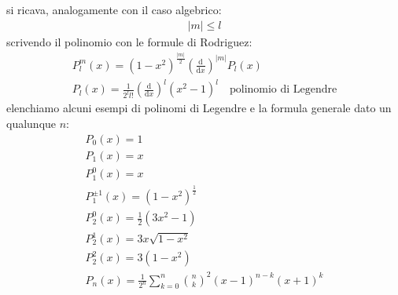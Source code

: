 si ricava, analogamente con il caso algebrico:
\begin{equation}\begin{split}
|m|\le l
\end{split}\end{equation}
scrivendo il polinomio con le formule di Rodriguez:
\begin{equation}\begin{split}
P_l^m\left(x\right)=\left(1-x^2\right)^{\frac{|m|}{2}}\left(\frac{\textrm{d}}{\textrm{d}x}\right)^{|m|}P_l\left(x\right)\\
P_l\left(x\right)=\frac{1}{2^ll!}\left(\frac{\textrm{d}}{\textrm{d}x}\right)^l\left(x^2-1\right)^l \quad \textrm{polinomio di Legendre}
\end{split}\end{equation}
elenchiamo alcuni esempi di polinomi di Legendre e la formula generale dato un qualunque $n$:
\begin{equation}\begin{split}
P_0\left(x\right)=1 \\
P_1\left(x\right)=x \\
P_1^0\left(x\right)=x \\
P_1^{\pm 1}\left(x\right)=\left(1-x^2\right)^{\frac{1}{2}} \\
P_2^0\left(x\right)=\frac{1}{2}\left(3x^2-1\right) \\
P_2^1\left(x\right)=3x\sqrt{1-x^2} \\
P_2^2\left(x\right)=3\left(1-x^2\right) \\
P_n\left(x\right)=\frac{1}{2^n}\sum_{k=0}^{n}{{{n}\choose{k}}^2\left(x-1\right)^{n-k}\left(x+1\right)^{k}}
\end{split}\end{equation}

